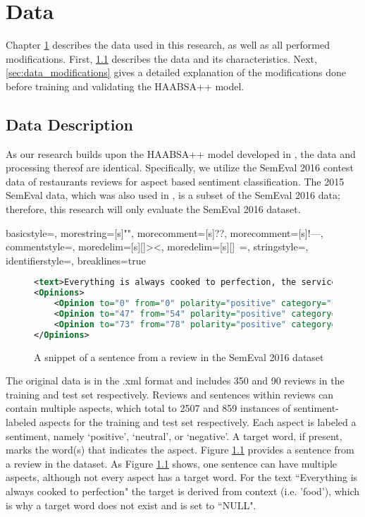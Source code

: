 \chapter{Data}
    \label{chap:data}

Chapter \ref{chap:data} describes the data used in this research, as well as all performed modifications. First, \ref{sec:data_description} describes the data and its characteristics. Next, \ref{sec:data_modifications} gives a detailed explanation of the modifications done before training and validating the HAABSA++ model. 

\section{Data Description}
    \label{sec:data_description}
As our research builds upon the HAABSA++ model developed in \cite{Trusca}, the data and processing thereof are identical. Specifically, we utilize the SemEval 2016 contest data of restaurants reviews for aspect based sentiment classification. The 2015 SemEval data, which was also used in \cite{Trusca}, is a subset of the SemEval 2016 data; therefore, this research will only evaluate the SemEval 2016 dataset. 

{
  basicstyle=\ttfamily,
  morestring=[s]{"}{"},
  morecomment=[s]{?}{?},
  morecomment=[s]{!--}{--},
  commentstyle=\color{darkgreen},
  moredelim=[s][\color{black}]{>}{<},
  moredelim=[s][\color{red}]{\ }{=},
  stringstyle=\color{blue},
  identifierstyle=\color{green},
  breaklines=true %
}
\begin{figure}
\begin{lstlisting}[language=xml]
<text>Everything is always cooked to perfection, the service is excellent, the decor cool and understated.</text>
<Opinions>
	<Opinion to="0" from="0" polarity="positive" category="FOOD#QUALITY" target="NULL"/>
	<Opinion to="47" from="54" polarity="positive" category="SERVICE#GENERAL" target="service"/>
	<Opinion to="73" from="78" polarity="positive" category="AMBIENCE#GENERAL" target="decor"/>
</Opinions>
\end{lstlisting}
\caption{A snippet of a sentence from a review in the SemEval 2016 dataset}
\label{fig:review_snippet}
\end{figure}

The original data is in the .xml format and includes 350 and 90 reviews in the training and test set respectively. Reviews and sentences within reviews can contain multiple aspects, which total to 2507 and 859 instances of sentiment-labeled aspects for the training and test set respectively. Each aspect is labeled a sentiment, namely `positive', `neutral', or `negative'. A target word, if present, marks the word(s) that indicates the aspect. Figure \ref{fig:review_snippet} provides a sentence from a review in the dataset. As Figure \ref{fig:review_snippet} shows, one sentence can have multiple aspects, although not every aspect has a target word. For the text ``Everything is always cooked to perfection" the target is derived from context (i.e. 'food'), which is why a target word does not exist and is set to ``NULL".


